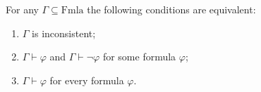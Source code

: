 For any $\Gamma \subseteq \text{Fmla}$ the following conditions are equivalent:

\begin{enumerate}
\item[(i)] $\Gamma$ is inconsistent;
\item[(ii)] $\Gamma \vdash \varphi$ and $\Gamma \vdash \neg\varphi$ for some formula $\varphi$;
\item[(iii)] $\Gamma \vdash \varphi$ for every formula $\varphi$.
\end{enumerate}
